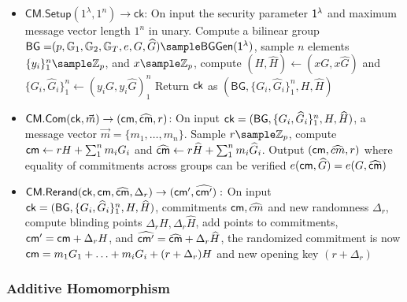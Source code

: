 \begin{itemize}
    \item $\mathsf{CM.Setup}(1^\lambda, 1^n) \to \mathsf{ck}$: 
    On input the security parameter $\mathsf{1^{\lambda}}$ and maximum message vector length $1^n$ in unary. Compute a bilinear group $\mathsf{BG =}(p, \G_1, \G_2, \G_T, e, G, \widehat{G}) \sample \mathsf{BGGen}(\secparam)$, 
    sample $n$ elements $\{y_i\}_1^n \sample \Z_p$, and $x \sample \Z_p$, compute $(H, \widehat{H}) \gets (xG, x\widehat{G})$ and $\{G_i, \widehat{G}_i\}_1^n \gets (y_iG, y_i\widehat{G})_1^n$ Return $\mathsf{ck}$ as $(\mathsf{BG}, \{G_i, \widehat{G}_i\}_1^n, H,\widehat{H})$

    \item $\mathsf{CM.Com}(\mathsf{ck}, \vec{m}) \to (\mathsf{cm}, \widehat{\mathsf{cm}}, r)$: On input $\mathsf{ck} = (\mathsf{BG}, \{G_i, \widehat{G}_i\}_1^n, H,\widehat{H})$, a message vector $\vec{m} = \{m_1, \ldots, m_n\}$. Sample $r \sample \Z_p$, compute $\mathsf{cm} \gets rH + \sum_1^n m_iG_i$ and $\widehat{\mathsf{cm}} \gets r\widehat{H} + \sum_1^n m_i\widehat{G}_i$. Output $(\mathsf{cm}, \widehat{cm}, r)$ where equality of commitments across groups can be verified $e(\mathsf{cm}, \widehat{G}) = e(G, \widehat{\mathsf{cm}})$
    
    \item $\mathsf{CM.Rerand}(\mathsf{ck}, \mathsf{cm}, \widehat{\mathsf{cm}}, \Delta_r) \to (\mathsf{cm'}, \widehat{\mathsf{cm'}}):$
    On input $\mathsf{ck} = (\mathsf{BG}, \{G_i, \widehat{G}_i\}_1^n, H,\widehat{H})$, commitments $\mathsf{cm}, \widehat{cm}$ and new randomness $\Delta_r$, compute blinding points $\Delta_rH, \Delta_r\widehat{H}$, add points to commitments, $\mathsf{cm}' = \mathsf{cm} + \Delta_rH$, and $\widehat{\mathsf{cm}'} = \widehat{\mathsf{cm}} + \Delta_r\widehat{H}$, the randomized commitment is now $\mathsf{cm} = m_1G_1 + \ldots + m_iG_i + (r + \Delta_r)H$ and new opening key $(r + \Delta_r)$
\end{itemize}


\subsubsection{Additive Homomorphism}

